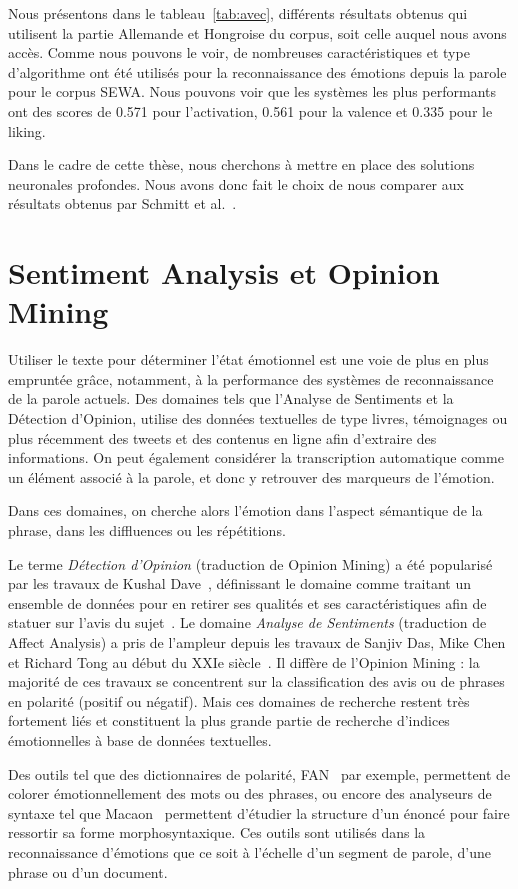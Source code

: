Nous présentons dans le tableau~\ref{tab:avec}, différents résultats obtenus qui utilisent la partie Allemande et Hongroise du corpus, soit celle auquel nous avons accès. Comme nous pouvons le voir, de nombreuses caractéristiques et type d'algorithme ont été utilisés pour la reconnaissance des émotions depuis la parole pour le corpus SEWA. Nous pouvons voir que les systèmes les plus performants ont des scores de 0.571 pour l'activation, 0.561 pour la valence et 0.335 pour le liking.

Dans le cadre de cette thèse, nous cherchons à mettre en place des solutions neuronales profondes. Nous avons donc fait le choix de nous comparer aux résultats obtenus par Schmitt et al.~\cite{Schmitt2019}.

\section{Sentiment Analysis et Opinion Mining}
Utiliser le texte pour déterminer l'état émotionnel est une voie de plus en plus empruntée grâce, notamment, à la performance des systèmes de reconnaissance de la parole actuels.
Des domaines tels que l'Analyse de Sentiments et la Détection d'Opinion, utilise des données textuelles de type livres, témoignages ou plus récemment des tweets et  des contenus en ligne afin d'extraire des informations. On peut également considérer la transcription automatique comme un élément associé à la parole, et donc y retrouver des marqueurs de l'émotion.

Dans ces domaines, on cherche alors l'émotion dans l'aspect sémantique de la phrase, dans les diffluences ou les répétitions.

Le terme \textit{Détection d'Opinion} (traduction de Opinion Mining) a été popularisé par les travaux de Kushal Dave~\cite{Dave2003}, définissant le domaine comme traitant un ensemble de données pour en retirer ses qualités et ses caractéristiques afin de statuer sur l'avis du sujet~\cite{Pang2008}. Le domaine \textit{Analyse de Sentiments} (traduction de Affect Analysis) a pris de l'ampleur depuis les travaux de Sanjiv Das, Mike Chen et Richard Tong au début du XXIe siècle~\cite{Das2007,Tong2001}. Il diffère de l'Opinion Mining : la majorité de ces travaux se concentrent sur la classification des avis ou de phrases en polarité (positif ou négatif). Mais ces domaines de recherche restent très fortement liés et constituent la plus grande partie de recherche d'indices émotionnelles à base de données textuelles.

Des outils tel que des dictionnaires de polarité, FAN~\cite{Monnier2014} par exemple, permettent de colorer émotionnellement des mots ou des phrases, ou encore des analyseurs de syntaxe tel que Macaon~\cite{Nasr2011} permettent d'étudier la structure d'un énoncé pour faire ressortir sa forme morphosyntaxique. Ces outils sont utilisés dans la reconnaissance d'émotions que ce soit à l'échelle d'un segment de parole, d'une phrase ou d'un document.

